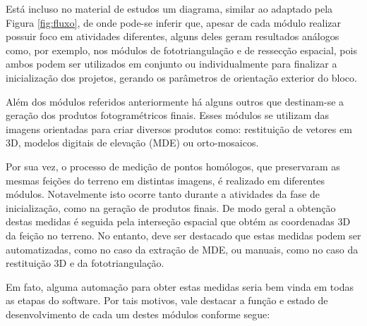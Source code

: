 Está incluso no material de estudos um diagrama, similar ao adaptado pela Figura \ref{fig:fluxo}, de onde pode-se inferir que, apesar de cada módulo realizar possuir foco em atividades diferentes, alguns deles geram resultados análogos como, por exemplo, nos módulos de fototriangulação e de ressecção espacial, pois ambos podem ser utilizados em conjunto ou individualmente para finalizar a inicialização dos projetos, gerando os parâmetros de orientação exterior do bloco.

Além dos módulos referidos anteriormente há alguns outros que destinam-se a geração dos produtos fotogramétricos finais. Esses módulos se utilizam das imagens orientadas para criar diversos produtos como: restituição de vetores em 3D, modelos digitais de elevação (MDE) ou orto-mosaicos.

Por sua vez, o processo de medição de pontos homólogos, que preservaram as mesmas feições do terreno em distintas imagens, é realizado em diferentes módulos. Notavelmente isto ocorre tanto durante a atividades da fase de inicialização, como na geração de produtos finais. De modo geral a obtenção destas medidas é seguida pela interseção espacial que obtém as coordenadas 3D da feição no terreno. No entanto, deve ser destacado que estas medidas podem ser automatizadas, como no caso da extração de MDE, ou manuais, como no caso da restituição 3D e da fototriangulação. 

Em fato, alguma automação para obter estas medidas seria bem vinda em todas as etapas do software. Por tais motivos, vale destacar a função e estado de desenvolvimento de cada um destes módulos conforme segue:


